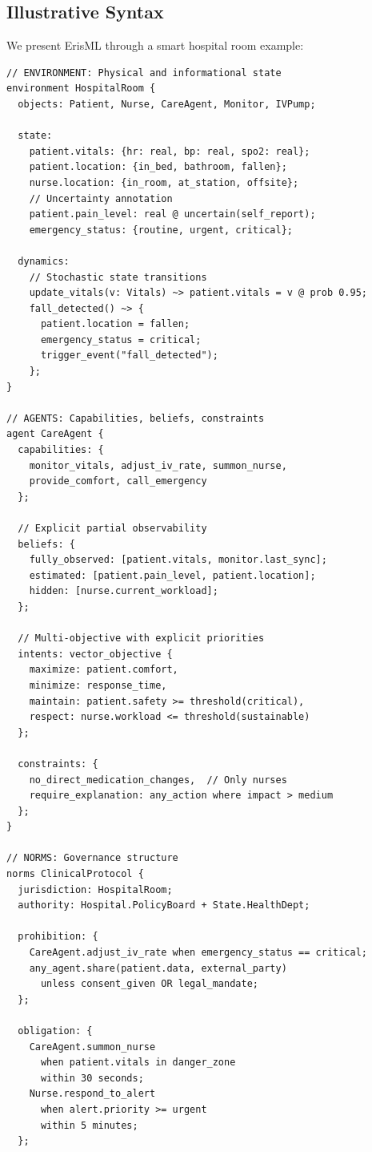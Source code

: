 \documentclass[conference]{IEEEtran}
\begin{document}
\subsection{Illustrative Syntax}

We present ErisML through a smart hospital room example:

\begin{lstlisting}
// ENVIRONMENT: Physical and informational state
environment HospitalRoom {
  objects: Patient, Nurse, CareAgent, Monitor, IVPump;

  state:
    patient.vitals: {hr: real, bp: real, spo2: real};
    patient.location: {in_bed, bathroom, fallen};
    nurse.location: {in_room, at_station, offsite};
    // Uncertainty annotation
    patient.pain_level: real @ uncertain(self_report);
    emergency_status: {routine, urgent, critical};

  dynamics:
    // Stochastic state transitions
    update_vitals(v: Vitals) ~> patient.vitals = v @ prob 0.95;
    fall_detected() ~> {
      patient.location = fallen;
      emergency_status = critical;
      trigger_event("fall_detected");
    };
}

// AGENTS: Capabilities, beliefs, constraints
agent CareAgent {
  capabilities: {
    monitor_vitals, adjust_iv_rate, summon_nurse,
    provide_comfort, call_emergency
  };

  // Explicit partial observability
  beliefs: {
    fully_observed: [patient.vitals, monitor.last_sync];
    estimated: [patient.pain_level, patient.location];
    hidden: [nurse.current_workload];
  };

  // Multi-objective with explicit priorities
  intents: vector_objective {
    maximize: patient.comfort,
    minimize: response_time,
    maintain: patient.safety >= threshold(critical),
    respect: nurse.workload <= threshold(sustainable)
  };

  constraints: {
    no_direct_medication_changes,  // Only nurses
    require_explanation: any_action where impact > medium
  };
}

// NORMS: Governance structure
norms ClinicalProtocol {
  jurisdiction: HospitalRoom;
  authority: Hospital.PolicyBoard + State.HealthDept;

  prohibition: {
    CareAgent.adjust_iv_rate when emergency_status == critical;
    any_agent.share(patient.data, external_party)
      unless consent_given OR legal_mandate;
  };

  obligation: {
    CareAgent.summon_nurse
      when patient.vitals in danger_zone
      within 30 seconds;
    Nurse.respond_to_alert
      when alert.priority >= urgent
      within 5 minutes;
  };


\end{lstlisting}
\end{document}
